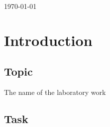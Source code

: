 \documentclass[12pt]{article}
\begin{document}
\begin{titlepage}
\begin{center}
      \vspace{5 mm}


      {\large \today}\\[3cm] %




      \vfill %
      \end{center}
      \end{titlepage}



  \section{Introduction}

  \subsection{Topic}

  The name of the laboratory work

  \subsection{Task}
\end{document}
